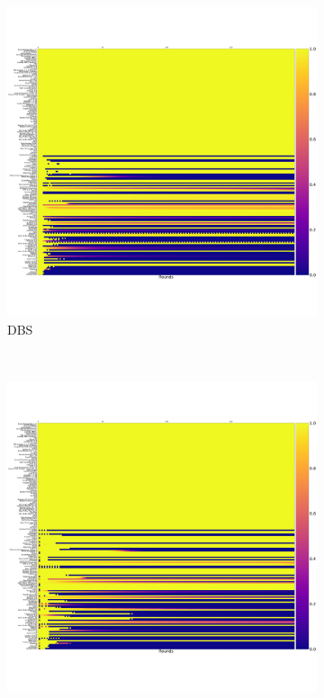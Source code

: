 \documentclass{article}
\begin{document}
\begin{figure}[!hbtp]
    \centering
    \begin{subfigure}[t]{.3\textwidth}
        \centering
        \includegraphics[width=\textwidth]{./assets/cooperation_0_0_10000_DBS_0-75_3_4_3_5_array.pdf}
        \caption{DBS}
    \end{subfigure}%
    ~
    \begin{subfigure}[t]{.3\textwidth}
        \centering
        \includegraphics[width=\textwidth]{./assets/cooperation_0_0_10000_Evolved_ANN_5_Noise_05_array.pdf}

\end{subfigure}
\end{figure}
\end{document}
